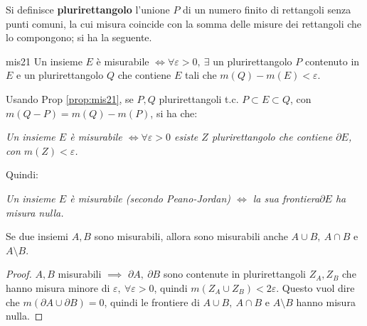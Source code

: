 \documentclass[11pt, a4paper]{scrartcl}
\theoremstyle{definition}
\numberwithin{esempio}{section}
\theoremstyle{definition}
\numberwithin{obs}{section}
\numberwithin{nota}{section}
\numberwithin{equation}{subsection}
\begin{document}
Si definisce \textbf{plurirettangolo} l'unione $P$ di un numero finito di rettangoli senza punti comuni, la cui misura coincide con la somma delle misure dei rettangoli che lo compongono; si ha la seguente.
\begin{prop}
	{}{mis21}
	Un insieme $E$ \`e misurabile $\iff \forall \varepsilon >0, \ \exists $ un plurirettangolo $P$ contenuto in $E$ e un plurirettangolo $Q$ che contiene $E$ tali che $m(Q) - m(E) < \varepsilon $.
\end{prop}
\noindent Usando Prop \ref{prop:mis21}, se $P,Q$ plurirettangoli t.c. $P \subset E \subset Q$, con $m(Q-P) = m(Q) - m(P)$, si ha che:
\begin{center}
	\textit{Un insieme $E$ \`e misurabile $\iff \forall \varepsilon > 0$ esiste $Z$ plurirettangolo che contiene $\partial E$, con $m(Z)<\varepsilon $.} 
\end{center}
Quindi:
\begin{center}
	\textit{Un insieme $E$ \`e misurabile (secondo Peano-Jordan) $\iff$ la sua frontiera\newline $\partial E$ ha misura nulla.} 
\end{center}
\begin{prop}
	{}{}
	Se due insiemi $A,B$ sono misurabili, allora sono misurabili anche $A \cup B , \ A \cap B $ e $A \setminus B$.
	\begin{proof}
		$A,B$ misurabili $\implies$ $\partial A, \ \partial B$ sono contenute in plurirettangoli $Z_A,Z_B$ che hanno misura minore di $\varepsilon , \ \forall \varepsilon >0$, quindi $m(Z_A \cup Z_B) < 2 \varepsilon $. Questo vuol dire che $m(\partial A \cup \partial B) = 0$, quindi le frontiere di $A\cup B , \ A \cap B $ e $A \setminus B$ hanno misura nulla.
	\end{proof}
\end{prop}
\end{document}
